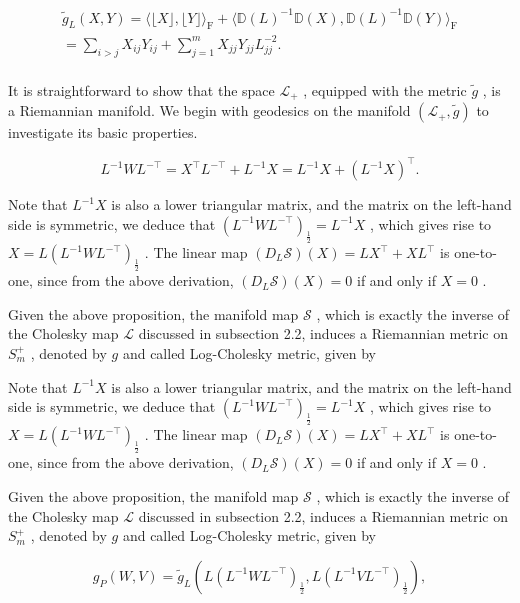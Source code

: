 \documentclass[11pt]{article}
\begin{document}
$$
\begin{array}{l} \tilde {g} _ {L} (X, Y) = \langle \lfloor X \rfloor , \lfloor Y \rfloor \rangle_ {\mathrm {F}} + \langle \mathbb {D} (L) ^ {- 1} \mathbb {D} (X), \mathbb {D} (L) ^ {- 1} \mathbb {D} (Y) \rangle_ {\mathrm {F}} \\ = \sum_ {i > j} X _ {i j} Y _ {i j} + \sum_ {j = 1} ^ {m} X _ {j j} Y _ {j j} L _ {j j} ^ {- 2}. \\ \end{array}
$$

It is straightforward to show that the space  $\mathcal{L}_{+}$ , equipped with the metric  $\tilde{g}$ , is a Riemannian manifold. We begin with geodesics on the manifold  $(\mathcal{L}_{+},\tilde{g})$  to investigate its basic properties.

$$
L ^ {- 1} W L ^ {- \top} = X ^ {\top} L ^ {- \top} + L ^ {- 1} X = L ^ {- 1} X + (L ^ {- 1} X) ^ {\top}.
$$

Note that  $L^{-1}X$  is also a lower triangular matrix, and the matrix on the left-hand side is symmetric, we deduce that  $(L^{-1}WL^{-\top})_{\frac{1}{2}} = L^{-1}X$ , which gives rise to  $X = L(L^{-1}WL^{-\top})_{\frac{1}{2}}$ . The linear map  $(D_L\mathcal{S})(X) = LX^\top +XL^\top$  is one-to-one, since from the above derivation,  $(D_L\mathcal{S})(X) = 0$  if and only if  $X = 0$ .

Given the above proposition, the manifold map  $\mathcal{S}$ , which is exactly the inverse of the Cholesky map  $\mathcal{L}$  discussed in subsection 2.2, induces a Riemannian metric on  $S_{m}^{+}$ , denoted by  $g$  and called Log-Cholesky metric, given by

Note that  $L^{-1}X$  is also a lower triangular matrix, and the matrix on the left-hand side is symmetric, we deduce that  $(L^{-1}WL^{-\top})_{\frac{1}{2}} = L^{-1}X$ , which gives rise to  $X = L(L^{-1}WL^{-\top})_{\frac{1}{2}}$ . The linear map  $(D_L\mathcal{S})(X) = LX^\top +XL^\top$  is one-to-one, since from the above derivation,  $(D_L\mathcal{S})(X) = 0$  if and only if  $X = 0$ .

Given the above proposition, the manifold map  $\mathcal{S}$ , which is exactly the inverse of the Cholesky map  $\mathcal{L}$  discussed in subsection 2.2, induces a Riemannian metric on  $S_{m}^{+}$ , denoted by  $g$  and called Log-Cholesky metric, given by

$$
g _ {P} (W, V) = \tilde {g} _ {L} \left(L \left(L ^ {- 1} W L ^ {- \top}\right) _ {\frac {1}{2}}, L \left(L ^ {- 1} V L ^ {- \top}\right) _ {\frac {1}{2}}\right), \tag {3.1}
$$
\end{document}
